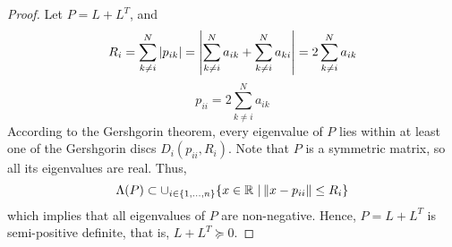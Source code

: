 \documentclass[a4 paper, 12pt]{article}
\begin{document}
\begin{proof}
Let $P=L+L^T$, and
\begin{align}
        R_i = \sum_{k\neq i}^N \left|p_{ik}\right| = \left|\sum_{k\neq i}^Na_{ik} + \sum_{k\neq i}^Na_{ki}\right| = 2\sum_{k\neq i}^N a_{ik}
\end{align}
\begin{equation}
        p_{ii} = 2\sum_{k\neq i}^N a_{ik}
\end{equation}
According to the Gershgorin theorem, every eigenvalue of $P$ lies within at least one of the Gershgorin discs $D_i(p_{ii}, R_i)$. Note that $P$ is a symmetric matrix, so all its eigenvalues are real. Thus,
\begin{equation}
        \Lambda(P) \subset \cup_{i\in\{1,...,n\}} \{ x\in\mathbb{R} \ | \left\|x-p_{ii}\right\| \leq R_i \}
\end{equation}
which implies that all eigenvalues of $P$ are non-negative. Hence, $P=L+L^T$ is semi-positive definite, that is, $L+L^T \succeq 0$.

\end{proof}




\end{document}
